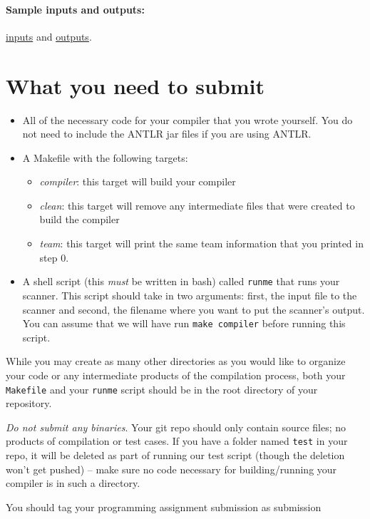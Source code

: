 \documentclass{article}
\begin{document}
\paragraph{Sample inputs and outputs:} \href{https://hegden.github.io/cs406/homeworks/PA3/inputs.zip}{inputs} and \href{https://hegden.github.io/cs406/homeworks/PA3/outputs.zip}{outputs}.

\section{What you need to submit}
\begin{itemize}
	\item All of the necessary code for your compiler that you wrote yourself. You do not need to include the ANTLR jar files if you are using ANTLR.
	\item A Makefile with the following targets:
		\begin{itemize}
			\item {\em compiler}: this target will build your compiler
			\item {\em clean}: this target will remove any intermediate files that were created to build the compiler
			\item {\em team}: this target will print the same team information that you printed in step 0.
		\end{itemize}

	\item A shell script (this {\em must} be written in bash) called \texttt{runme} that runs your scanner. This script should take in two arguments: first, the input file to the scanner and second, the filename where you want to put the scanner's output. You can assume that we will have run \texttt{make compiler} before running this script.
\end{itemize}

While you may create as many other directories as you would like to organize your code or any intermediate products of the compilation process, both your \texttt{Makefile} and your \texttt{runme} script should be in the root directory of your repository.

{\em Do not submit any binaries}. Your git repo should only contain source files; no products of compilation or test cases. If you have a folder named \texttt{test} in your repo, it will be deleted as part of running our test script (though the deletion won't get pushed) -- make sure no code necessary for building/running your compiler is in such a directory.

You should tag your programming assignment submission as \textsf{submission}
\end{document}
